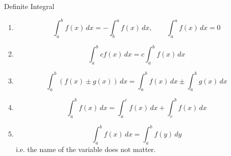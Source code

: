 \documentclass{beamer}
\begin{document}
\begin{frame}{Definite Integral}
    \begin{enumerate}[<+->]
        \item \[\int_{a}^{b} f(x) \,dx = -\int_{b}^{a} f(x) \,dx,\qquad \int_{a}^{a} f(x) \,dx = 0
\]
        \item \[\int_{a}^{b} cf(x) \,dx = c \int_{a}^{b} f(x) \,dx
\]
\item \[\int_{a}^{b} (f(x) \pm g(x)) \,dx = \int_{a}^{b} f(x) \,dx \pm \int_{a}^{b} g(x) \,dx
\]
\item \[\int_{a}^{b} f(x) \,dx = \int_{a}^{c} f(x) \,dx + \int_{c}^{b} f(x) \,dx\]

\item \[\int_{a}^{b} f(x) \,dx = \int_{a}^{b} f(y) \,dy\]
i.e. the name of the variable does not matter.
    \end{enumerate}
    
\end{frame}








%  
    

  
\end{document}

